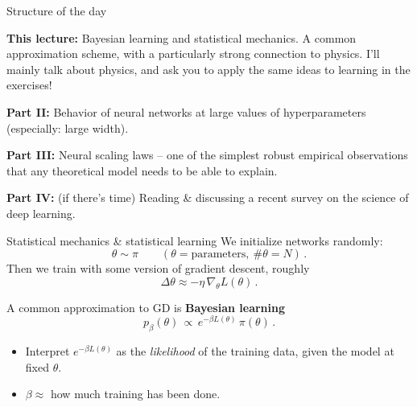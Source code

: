 \documentclass[11pt]{beamer}
\newcommand{\hl}[1]{{\color{blue!60!black}\textbf{#1}}}
\begin{document}
\begin{frame}{Structure of the day}

\hl{This lecture:} Bayesian learning and statistical mechanics. A common approximation scheme, with a particularly strong connection to physics. I'll mainly talk about physics, and ask you to apply the same ideas to learning in the exercises!

\medskip

\hl{Part II:} Behavior of neural networks at large values of hyperparameters (especially: large width). 

\medskip

\hl{Part III:} Neural scaling laws -- one of the simplest robust empirical observations that any theoretical model needs to be able to explain.

\medskip

\hl{Part IV:} (if there's time) Reading \& discussing a recent survey on the science of deep learning.
\end{frame}



\begin{frame}{Statistical mechanics \& statistical learning}
  We initialize networks randomly:
  \[ \theta \sim \pi \qquad (\theta = \text{parameters},\ \#\theta = N)\,. \]
  Then we train with some version of gradient descent, roughly
  \[ \Delta\theta \approx -\eta\, \nabla_\theta L(\theta)\,. \]
  \vspace{1mm}

  A common approximation to GD is \hl{Bayesian learning}
  \[ p_\beta(\theta) \,\propto\, e^{-\beta L(\theta)}\, \pi(\theta)\,. \]
  \vspace{-.6cm}
  \begin{itemize}
    \item Interpret $e^{-\beta L(\theta)}$ as the \emph{likelihood} of the
      training data, given the model at fixed $\theta$.
    \item $\beta \approx$ how much training has been done.
  \end{itemize}
\end{frame}
\end{document}
